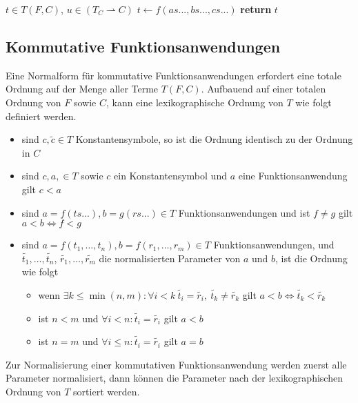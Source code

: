 \documentclass{article}
\begin{document}
\begin{algorithm}
\caption{$\mathrm{flatten} \colon T \times (T_C \rightharpoonup C) \rightarrow T$}\label{flatten}
\begin{algorithmic}[1] %
\Require $t \in T(F, C)$, $u \in (T_C \rightharpoonup C)$
		\State $t \leftarrow f(as..., bs..., cs...)$
	\EndWhile
\EndIf
\State \textbf{return} $t$ 
\end{algorithmic}
\end{algorithm}

\subsection{Kommutative Funktionsanwendungen}
Eine Normalform für kommutative Funktionsanwendungen erfordert eine totale Ordnung auf der Menge aller Terme $T(F, C)$. Aufbauend auf einer totalen Ordnung von $F$ sowie $C$, kann eine lexikographische Ordnung von $T$ wie folgt definiert werden. 
\begin{itemize}
	\item{sind $c, \tilde{c} \in T$ Konstantensymbole, so ist die Ordnung identisch zu der Ordnung in $C$}
	\item{sind $c, a, \in T$ sowie $c$ ein Konstantensymbol und $a$ eine Funktionsanwendung gilt $c < a$ }
	\item{sind $a = f(ts...), b = g(rs...) \in T$ Funktionsanwendungen und ist $f \neq g$ gilt $a < b \iff f < g $}
	\item{sind $a = f(t_1, \dots, t_n), b = f(r_1, \dots, r_m) \in T$ Funktionsanwendungen, und $\tilde{t_1}, \dots, \tilde{t_n}$, $\tilde{r_1}, \dots, \tilde{r_m}$ die normalisierten Parameter von $a$ und $b$, ist die Ordnung wie folgt}
	\begin{itemize}
		\item{wenn $\exists k \leq \min{(n, m)} \colon \forall i < k ~ \tilde{t_i} = \tilde{r_i} ,~ \tilde{t_k} \neq \tilde{r_k} $ gilt ${a < b \iff \tilde{t_k} < \tilde{r_k}}$}
		\item{ist $n < m$ und $\forall i < n\colon \tilde{t_i} = \tilde{r_i}$ gilt $a < b$}
		\item{ist $n = m$ und $\forall i \leq n\colon \tilde{t_i} = \tilde{r_i}$ gilt $a = b$}
	\end{itemize}
\end{itemize}
Zur Normalisierung einer kommutativen Funktionsanwendung werden zuerst alle Parameter normalisiert, dann können die Parameter nach der lexikographischen Ordnung von $T$ sortiert werden.
\end{document}
